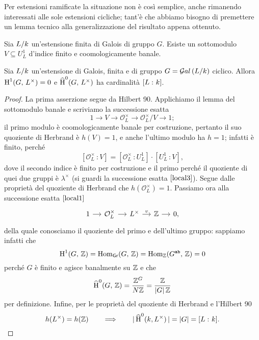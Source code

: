 Per estensioni ramificate la situazione non è così semplice, anche rimanendo interessati alle sole estensioni cicliche; tant'è che abbiamo bisogno di premettere un lemma tecnico alla generalizzazione del risultato appena ottenuto.

\begin{lemma}
	Sia $ L/k $ un'estensione finita di Galois di gruppo $ G $. Esiste un sottomodulo $ V \subseteq U_L^1 $ d'indice finito e coomologicamente banale.
\end{lemma}

\begin{theorem} \label{assioma} 
	Sia $ L/k $ un'estensione di Galois, finita e di gruppo $ G = \mathcal{G}al\left( L/k \right) $ ciclico. Allora $ \operatorname{H}^1(G, \, L^\times) = 0 $ e $ \operatorname{\widehat{H}}^0(G, \, L^\times) $ ha cardinalità $ [L \, \colon k] $.
\end{theorem}
\begin{proof}
	La prima asserzione segue da Hilbert 90. Applichiamo il lemma del sottomodulo banale e scriviamo la successione esatta 
	\[ 1 \to V \to \mathcal{O}_L^\times \to \mathcal{O}_L^\times/V \to 1; \]
	il primo modulo è coomologicamente banale per costruzione, pertanto il suo quoziente di Herbrand è $ h(V) = 1 $, e anche l'ultimo modulo ha $ h = 1 $; infatti è finito, perché $$  [\mathcal{O}_L^\times \, \colon V] = [\mathcal{O}_L^\times \,\colon U_L^1]\cdot[U_L^1 \,\colon V],  $$
	dove il secondo indice è finito per costruzione e il primo perché il quoziente di quei due gruppi è $ \lambda^\times $ (si guardi la successione esatta $ \ref{local3} $). Segue dalle proprietà del quoziente di Herbrand che $ h(\mathcal{O}_L^\times) = 1 $. Passiamo ora alla successione esatta $ \ref{local1} $
	\[ \begin{tikzcd}[column sep = small]
	1 \rar
	& \mathcal{O}_{L}^\times \rar
	& L^\times \rar["v"]
	& \Z \rar
	& 0,
	\end{tikzcd} \]
	della quale conosciamo il quoziente del primo e dell'ultimo gruppo: sappiamo infatti che $$  \operatorname{H}^1(G, \, \mathbb{Z}) = \operatorname{Hom}_\mathsf{Gr}(G, \, \mathbb{Z}) = \operatorname{Hom}_{\mathbb{Z}}(G^\texttt{ab}, \, \mathbb{Z}) = 0  $$ perché $ G $ è finito e agisce banalmente su $ \mathbb{Z} $ e che $$  \operatorname{\widehat{H}}^0(G, \, \mathbb{Z}) = \frac{\mathbb{Z}^G}{ N\mathbb{Z}} = \frac{\mathbb{Z}}{ |G|\, \mathbb{Z}}  $$ per definizione. Infine, per le proprietà del quoziente di Herbrand e l'Hilbert 90
	\[ h(L^\times) = h(\mathbb{Z}) \qquad\Longrightarrow\qquad |\operatorname{\widehat{H}}^0(k, L^\times)\, | = |G| = [L \, \colon k]. \]
\end{proof}


